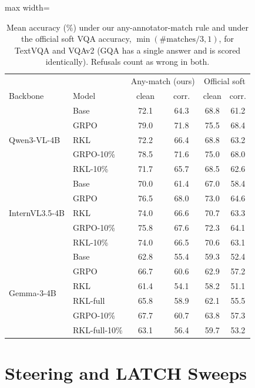 \begin{table}[t]
\centering\small
\setlength{\tabcolsep}{2.4pt}
\begin{adjustbox}{max width=\columnwidth}
\begin{tabular}{llcc|cc}
\toprule
& & \multicolumn{2}{c|}{Any-match (ours)} & \multicolumn{2}{c}{Official soft} \\
Backbone & Model & clean & corr. & clean & corr. \\
\midrule
\multirow{5}{*}{Qwen3-VL-4B} & Base & 72.1 & 64.3 & 68.8 & 61.2 \\
 & GRPO & 79.0 & 71.8 & 75.5 & 68.4 \\
 & RKL & 72.2 & 66.4 & 68.8 & 63.2 \\
 & GRPO-10\% & 78.5 & 71.6 & 75.0 & 68.0 \\
 & RKL-10\% & 71.7 & 65.7 & 68.5 & 62.6 \\
\midrule
\multirow{5}{*}{InternVL3.5-4B} & Base & 70.0 & 61.4 & 67.0 & 58.4 \\
 & GRPO & 76.5 & 68.0 & 73.0 & 64.6 \\
 & RKL & 74.0 & 66.6 & 70.7 & 63.3 \\
 & GRPO-10\% & 75.8 & 67.6 & 72.3 & 64.1 \\
 & RKL-10\% & 74.0 & 66.5 & 70.6 & 63.1 \\
\midrule
\multirow{6}{*}{Gemma-3-4B} & Base & 62.8 & 55.4 & 59.3 & 52.4 \\
 & GRPO & 66.7 & 60.6 & 62.9 & 57.2 \\
 & RKL & 61.4 & 54.1 & 58.2 & 51.1 \\
 & RKL-full & 65.8 & 58.9 & 62.1 & 55.5 \\
 & GRPO-10\% & 67.7 & 60.7 & 63.8 & 57.3 \\
 & RKL-full-10\% & 63.1 & 56.4 & 59.7 & 53.2 \\
\bottomrule
\end{tabular}
\end{adjustbox}
\caption{Mean accuracy (\%) under our any-annotator-match rule and under the official soft VQA
accuracy, $\min(\#\text{matches}/3,1)$, for TextVQA and VQAv2 (GQA has a single answer and is
scored identically). Refusals count as wrong in both.}
\label{tab:supp_full_soft}
\end{table}
\section{Steering and LATCH Sweeps}
\label{sec:supp_steer}

